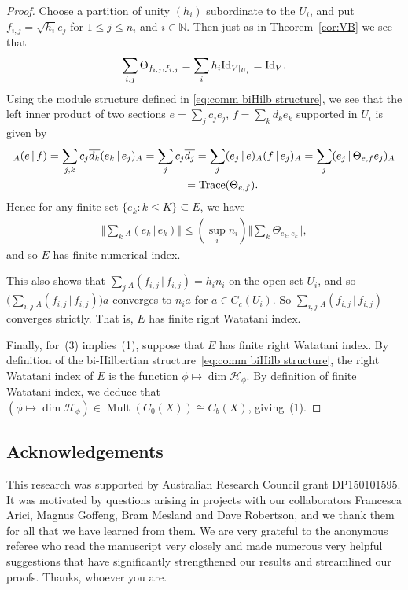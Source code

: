 \documentclass[pdftex]{sigma}
\numberwithin{equation}{section}
\DeclareMathOperator{\Mult}{Mult} %
\renewcommand{\H}{\mathcal{H}} %
\newcommand{\N}{\mathbb{N}} %
\newcommand{\ol}[1]{\overline{#1}} %
\begin{document}
\begin{proof}
Choose a partition of unity $(h_i)$ subordinate to the $U_i$, and put $f_{i,j} = \sqrt{h_i}e_j$ for $1\leq j \le n_i$ and $i \in \N$. Then just as in Theorem~\ref{cor:VB} we see that
\begin{gather*}
\sum_{i,j}\Theta_{f_{i,j},f_{i,j}}=\sum_ih_i{\rm Id}_{V|_{U_i}}={\rm Id}_V.
\end{gather*}
Using the module structure def\/ined in \eqref{eq:comm biHilb structure}, we see that the left inner product of two sections $e=\sum_jc_je_j$, $f=\sum_kd_ke_k$ supported in $U_i$ is given by
\begin{gather*}
{}_A(e\,|\, f)= \sum_{j,k}c_j\ol{d_k}(e_k\,|\, e_j)_A= \sum_jc_j\ol{d_j}=
 \sum_{j}(e_j\,|\, e)_A(f\,|\, e_j)_A= \sum_j(e_j\,|\,\Theta_{e,f}e_j)_A\\
 \hphantom{{}_A(e\,|\, f)}{} = {\rm Trace}(\Theta_{e,f}).
\end{gather*}
Hence for any f\/inite set $\{e_k \colon k \le K\} \subseteq E$, we have
\begin{gather*}
\Big\Vert \sum_k{}_A(e_k\,|\, e_k)\Big\Vert \leq (\sup_i n_i)\Big\Vert \sum_k\Theta_{e_k,e_k}\Big\Vert,
\end{gather*}
and so $E$ has f\/inite numerical index.

This also shows that $\sum_j{_A(f_{i,j} \,|\, f_{i,j})}=h_in_i$ on the open set $U_i$, and so $\big(\sum_{i,j} {_A(f_{i,j} \,|\, f_{i,j})} \big)a$ converges to $n_i a$ for $a \in C_c(U_i)$. So $\sum_{i,j} {_A(f_{i,j} \,|\, f_{i,j})}$ converges strictly. That is, $E$ has f\/inite right Watatani index.

Finally, for~(3) implies~(1), suppose that $E$ has f\/inite right Watatani index. By def\/inition of the bi-Hilbertian structure~\eqref{eq:comm biHilb structure}, the right Watatani index of $E$ is the function $\phi \mapsto \dim\H_\phi$. By def\/inition of f\/inite Watatani index, we deduce that $(\phi \mapsto \dim\H_\phi) \in \Mult(C_0(X)) \cong C_b(X)$, giving~(1).
\end{proof}

\subsection*{Acknowledgements} This research was supported by Australian Research Council grant DP150101595. It was motivated by questions arising in projects with our collaborators Francesca Arici, Magnus Gof\/feng, Bram Mesland and Dave Robertson, and we thank them for all that we have learned from them. We are very grateful to the anonymous referee who read the manuscript very closely and made numerous very helpful suggestions that have signif\/icantly strengthened our results and streamlined our proofs. Thanks, whoever you are.
\end{document}
